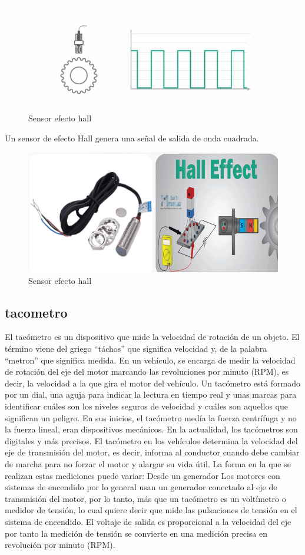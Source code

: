 \begin{figure}[h]
	\centering
	\includegraphics[width=0.7\linewidth]{img/efecto hall.jpg}
	\caption{Sensor efecto hall}
	\label{fig:insertarimagen}
\end{figure}

Un sensor de efecto Hall genera una señal de salida de onda cuadrada.

\begin{figure}[h]
	\centering
	\includegraphics[width=0.7\linewidth]{img/sensor efecto hall.png}
	\caption{Sensor efecto hall}
	\label{fig:insertarimagen}
\end{figure}

\subsection{tacometro }
El tacómetro es un dispositivo que mide la velocidad de rotación de un objeto. El término viene del griego “táchos” que significa velocidad y, de la palabra “metron” que significa medida. En un vehículo, se encarga de medir la velocidad de rotación del eje del motor marcando las revoluciones por minuto (RPM), es decir, la velocidad a la que gira el motor del vehículo.
Un tacómetro está formado por un dial, una aguja para indicar la lectura en tiempo real y unas marcas para identificar cuáles son los niveles seguros de velocidad y cuáles son aquellos que significan un peligro.
En sus inicios, el tacómetro medía la fuerza centrífuga y no la fuerza lineal, eran dispositivos mecánicos. En la actualidad, los tacómetros son digitales y más precisos.
El tacómetro en los vehículos determina la velocidad del eje de transmisión del motor, es decir, informa al conductor cuando debe cambiar de marcha para no forzar el motor y alargar su vida útil. La forma en la que se realizan estas mediciones puede variar:
Desde un generador
Los motores con sistemas de encendido por lo general usan un generador conectado al eje de transmisión del motor, por lo tanto, más que un tacómetro es un voltímetro o medidor de tensión, lo cual quiere decir que mide las pulsaciones de tensión en el sistema de encendido. El voltaje de salida es proporcional a la velocidad del eje por tanto la medición de tensión se convierte en una medición precisa en revolución por minuto (RPM).


